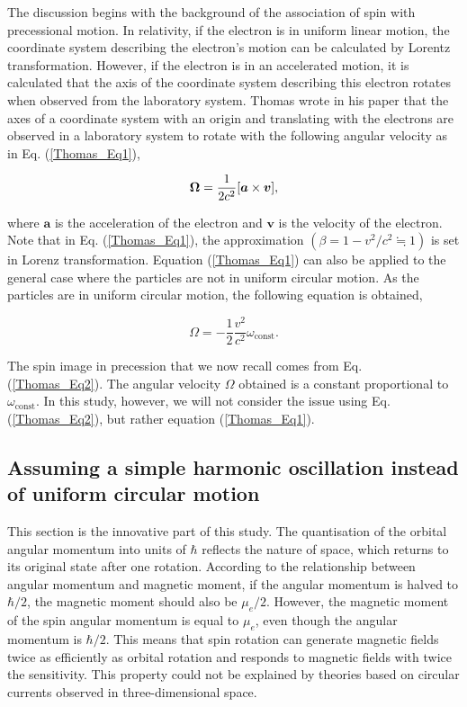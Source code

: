 \documentclass[10.5pt]{article}
\numberwithin{equation}{section}
\begin{document}
The discussion begins with the background of the association of spin with precessional motion. In relativity, if the electron is in uniform linear motion, the coordinate system describing the electron's motion can be calculated by Lorentz transformation. However, if the electron is in an accelerated motion, it is calculated that the axis of the coordinate system describing this electron rotates when observed from the laboratory system. Thomas wrote in his paper that the axes of a coordinate system with an origin and translating with the electrons are observed in a laboratory system to rotate with the following angular velocity as in Eq. (\ref{Thomas_Eq1}),

\begin{equation}
    {\bf \Omega}=\frac{1}{2 c^2}[{\boldsymbol a} \times {\boldsymbol v}],
    \label{Thomas_Eq1}
\end{equation}

\noindent where ${\boldsymbol a}$ is the acceleration of the electron and ${\boldsymbol v}$ is the velocity of the electron. Note that in Eq. (\ref{Thomas_Eq1}), the approximation $(\beta = 1 - v^2/c^2 \fallingdotseq 1)$ is set in Lorenz transformation. Equation (\ref{Thomas_Eq1}) can also be applied to the general case where the particles are not in uniform circular motion. As the particles are in uniform circular motion, the following equation is obtained,


\begin{equation}
    {\Omega}= - \frac{1}{2} \frac{v^2}{c^2} \omega_{\mathrm{const}}.
    \label{Thomas_Eq2}
\end{equation}

The spin image in precession that we now recall comes from Eq. (\ref{Thomas_Eq2}). The angular velocity $\Omega$ obtained is a constant proportional to $\omega_{\mathrm{const}}$. In this study, however, we will not consider the issue using Eq. (\ref{Thomas_Eq2}), but rather equation (\ref{Thomas_Eq1}).


\subsection{Assuming a simple harmonic oscillation instead of uniform circular motion}


This section is the innovative part of this study. The quantisation of the orbital angular momentum into units of $\hbar$ reflects the nature of space, which returns to its original state after one rotation. According to the relationship between angular momentum and magnetic moment, if the angular momentum is halved to $\hbar/2$, the magnetic moment should also be $\mu_e/2$. However, the magnetic moment of the spin angular momentum is equal to $\mu_e$, even though the angular momentum is $\hbar/2$. This means that spin rotation can generate magnetic fields twice as efficiently as orbital rotation and responds to magnetic fields with twice the sensitivity. This property could not be explained by theories based on circular currents observed in three-dimensional space.
\end{document}
